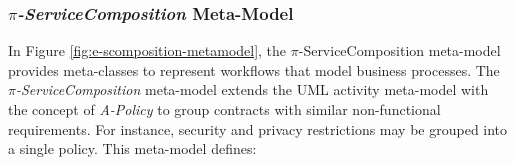 \documentclass{singlecol-new}
\theoremstyle{TH}{
\newtheorem{lemma}{Lemma}
\newtheorem{theorem}[lemma]{Theorem}
\newtheorem{corrolary}[lemma]{Corrolary}
\newtheorem{conjecture}[lemma]{Conjecture}
\newtheorem{proposition}[lemma]{Proposition}
\newtheorem{claim}[lemma]{Claim}
\newtheorem{stheorem}[lemma]{Wrong Theorem}
\newtheorem{algorithm}{Algorithm}
}
\theoremstyle{THrm}{
\newtheorem{definition}{Definition}[section]
\newtheorem{question}{Question}[section]
\newtheorem{remark}{Remark}
\newtheorem{scheme}{Scheme}
}
\theoremstyle{THhit}{
\newtheorem{case}{Case}[section]
}
\theoremstyle{THhsl}{
\newtheorem{example}{Example}
}
\begin{document}
\subsubsection{\textit{$\pi$-ServiceComposition} Meta-Model}

In Figure \ref{fig:e-scomposition-metamodel}, the $\pi$-Serv\-ice\-Com\-po\-si\-tion meta-model
provides meta-classes to represent workflows%
 that model  business processes.
The \textit{$\pi$-Serv\-ice\-Com\-po\-si\-tion} meta-model extends the UML activity  meta-model with the concept of  \textit{A-Policy}
to group contracts with similar non-functional requirements.
For instance, security and privacy restrictions may be grouped into a single policy.
 This meta-model defines:
\end{document}
